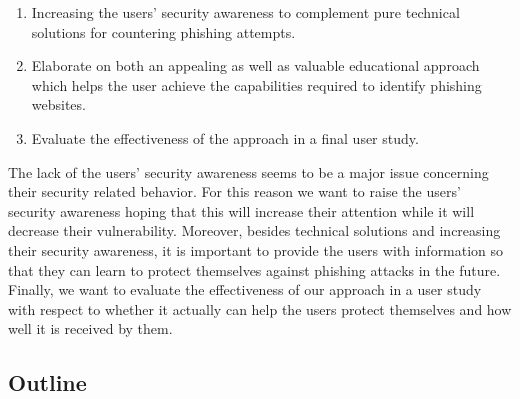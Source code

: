 \begin{enumerate}
	\item Increasing the users' security awareness to complement pure technical solutions for countering phishing attempts.
	\item Elaborate on both an appealing as well as valuable educational approach which helps the user achieve the capabilities required to identify phishing websites.
	\item Evaluate the effectiveness of the approach in a final user study.
\end{enumerate}
The lack of the users' security awareness seems to be a major issue concerning their security related behavior.
 For this reason we want to raise the users' security awareness hoping that this will increase their attention while it will decrease their vulnerability.
 Moreover, besides technical solutions and increasing their security awareness, it is important to provide the users with information so that they can learn to protect themselves against phishing attacks in the future.
Finally, we want to evaluate the effectiveness of our approach in a user study with respect to whether it actually can help the users protect themselves and how well it is received by them.

\subsection{Outline}


